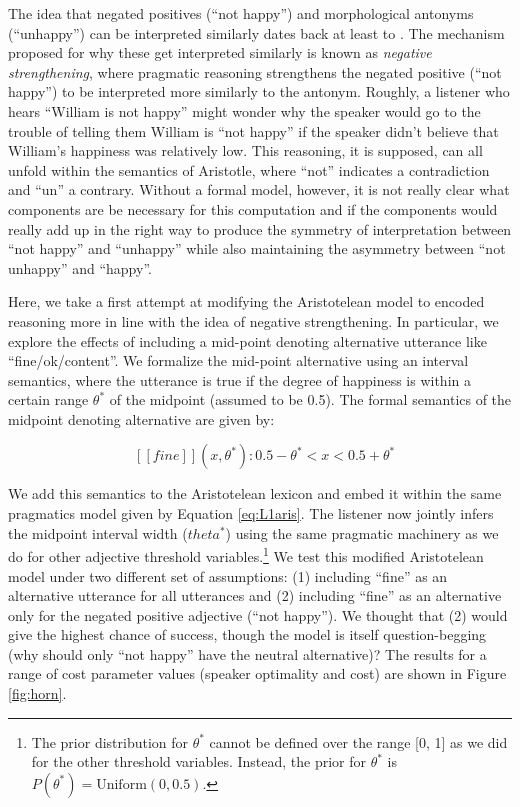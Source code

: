 \documentclass[floatsintext,doc]{apa6}
\let\rmarkdownfootnote\footnote%
\def\footnote{\protect\rmarkdownfootnote}
\begin{document}
The idea that negated positives (``not happy'') and morphological antonyms (``unhappy'') can be interpreted similarly dates back at least to . 
The mechanism proposed for why these get interpreted similarly is known as \emph{negative strengthening}, where pragmatic reasoning strengthens the negated positive (``not happy'') to be interpreted more similarly to the antonym.
Roughly, a listener who hears ``William is not happy'' might wonder why the speaker would go to the trouble of telling them William is ``not happy'' if the speaker didn’t believe that William’s happiness was relatively low.
This reasoning, it is supposed, can all unfold within the semantics of Aristotle, where ``not'' indicates a contradiction and ``un'' a contrary. 
Without a formal model, however, it is not really clear what components  are be necessary for this computation and if the components would really add up in the right way to produce the symmetry of interpretation between ``not happy'' and ``unhappy'' while also maintaining the asymmetry between ``not unhappy'' and ``happy''.

Here, we take a first attempt at modifying the Aristotelean model to encoded reasoning more in line with the idea of negative strengthening. 
In particular, we explore the effects of including a mid-point denoting alternative utterance like ``fine/ok/content''. 
We formalize the mid-point alternative using an interval semantics, where the utterance is true if the degree of happiness is within a certain range $\theta^*$ of the midpoint (assumed to be 0.5). The formal semantics of the midpoint denoting alternative are given by: 

\begin{equation}
\mbox{ $[\![fine]\!]$}(x, \theta^*): 0.5-  \theta^* < x < 0.5  + \theta^* \label{sem:fine}
\end{equation} 

We add this semantics to the Aristotelean lexicon and embed it within the same pragmatics model given by Equation \ref{eq:L1aris}.
The listener now jointly infers the midpoint interval width ($theta^*$) using the same pragmatic machinery as we do for other adjective threshold variables.\footnote{The prior distribution for $\theta^*$ cannot be defined over the range [0, 1] as we did for the other threshold variables. Instead, the prior for $\theta^*$ is $P(\theta^*) = \text{Uniform}(0, 0.5)$.}
We test this modified Aristotelean model  under two different set of assumptions: (1) including ``fine'' as an alternative utterance for all utterances and (2) including  ``fine''  as an alternative only for the negated positive adjective (“not happy”). 
We thought that (2) would give the highest chance of success, though the model is itself question-begging (why should only ``not happy'' have the neutral alternative)?  
The results for a range of cost parameter values (speaker optimality and cost) are shown in Figure \ref{fig:horn}. 
\end{document}

